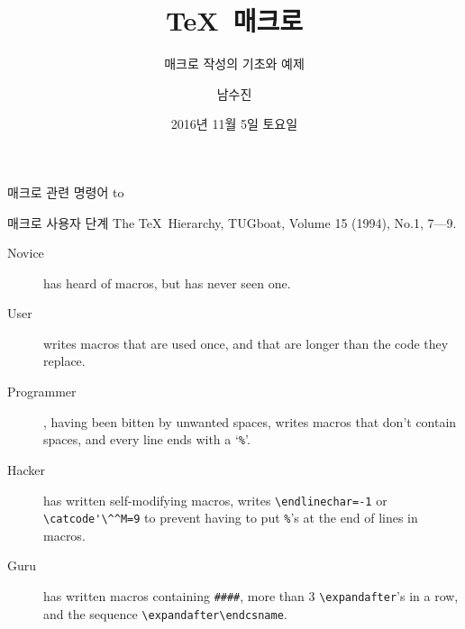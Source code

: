 \documentclass{beamer}
\title{\TeX\ 매크로}
\subtitle{매크로 작성의 기초와 예제}
\date{2016년 11월 5일 토요일}
\author{남수진}
\institute{
  2016 공주대학교 문서작성 워크숍 2016\\
  공주대학교 인문사회과학관 1층 컴퓨터실 107호}
\begin{document}
\maketitle


%
\begin{frame}{매크로 관련 명령어}
  \vspace{4mm}
  \hbox to
\end{frame}


%
\begin{frame}[fragile]{매크로 사용자 단계}
  The \TeX\ Hierarchy, TUGboat, Volume 15 (1994), No.1, 7---9.
  \begin{description}
  \item [Novice] has heard of macros, but has never seen one.
  \item [User] writes macros that are used once, and that are
    longer than the code they replace.
  \item [Programmer], having been bitten by unwanted spaces,
    writes macros that don't contain spaces, and every line ends with
    a `{\small\verb+%+}'.
  \item [Hacker] has written self-modifying macros, writes
    {\small\verb+\endlinechar=-1+} or {\small\verb+\catcode'\^^M=9+}
    to prevent having to put {\small\verb+%+}'s at the end of lines in macros.
  \item [Guru] has written macros containing {\small\verb+####+}, more than 3
    {\small\verb+\expandafter+}'s in a row, and the sequence
    {\small\verb+\expandafter\endcsname+}.
  \end{description}
\end{frame}
\end{document}
